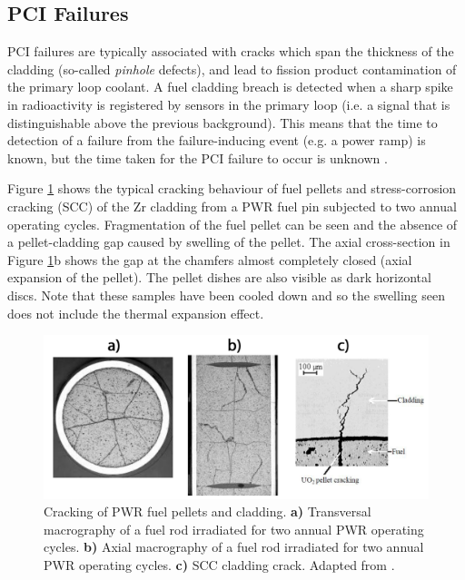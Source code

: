 \subsection{PCI Failures}

PCI failures are typically associated with cracks which span the thickness of the cladding (so-called \emph{pinhole} defects), and lead to fission product contamination of the primary loop coolant. A fuel cladding breach is detected when a sharp spike in radioactivity is registered by sensors in the primary loop (i.e. a signal that is distinguishable above the previous background). This means that the time to detection of a failure from the failure-inducing event (e.g. a power ramp) is known, but the time taken for the PCI failure to occur is unknown \cite{bcoxpelletclad1990}. 

Figure \ref{figure:fuelcladdingcrack} shows the typical cracking behaviour of fuel pellets and stress-corrosion cracking (SCC) of the Zr cladding from a PWR fuel pin subjected to two annual operating cycles. Fragmentation of the fuel pellet can be seen and the absence of a pellet-cladding gap caused by swelling of the pellet. The axial cross-section in Figure \ref{figure:fuelcladdingcrack}b shows the gap at the chamfers almost completely closed (axial expansion of the pellet). The pellet dishes are also visible as dark horizontal discs. Note that these samples have been cooled down and so the swelling seen does not include the thermal expansion effect. 

\begin{figure}[ht] %
\centering
\includegraphics[width=\linewidth]{images/fuelcladdingcrack.png}
\caption[Cracking of PWR fuel pellets and cladding. \textbf{a)} Transversal macrography of a fuel rod irradiated for two annual PWR operating cycles. \textbf{b)} Axial macrography of a fuel rod irradiated for two annual PWR operating cycles. \textbf{c)} SCC cladding failure.]{Cracking of PWR fuel pellets and cladding. \textbf{a)} Transversal macrography of a fuel rod irradiated for two annual PWR operating cycles. \textbf{b)} Axial macrography of a fuel rod irradiated for two annual PWR operating cycles. \textbf{c)} SCC cladding crack. Adapted from \cite{brochard2001modelling}.}
\label{figure:fuelcladdingcrack}
\end{figure}


